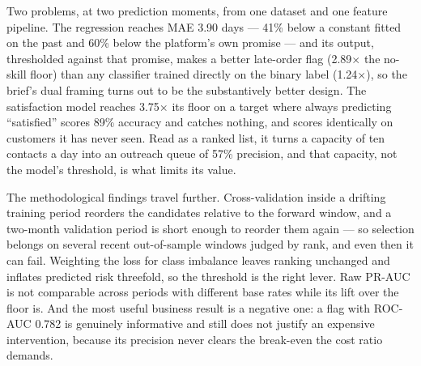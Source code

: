 Two problems, at two prediction moments, from one dataset and one feature
pipeline. The regression reaches MAE 3.90 days --- 41\% below a constant fitted
on the past and 60\% below the platform's own promise --- and its output,
thresholded against that promise, makes a better late-order flag (2.89$\times$
the no-skill floor) than any classifier trained directly on the binary label
(1.24$\times$), so the brief's dual framing turns out to be the substantively
better design. The satisfaction model reaches 3.75$\times$ its floor on a target
where always predicting ``satisfied'' scores 89\% accuracy and catches nothing,
and scores identically on customers it has never seen. Read as a ranked list, it
turns a capacity of ten contacts a day into an outreach queue of 57\%
precision, and that capacity, not the model's threshold, is what limits its
value.

The methodological findings travel further. Cross-validation inside a drifting
training period reorders the candidates relative to the forward window, and a
two-month validation period is short enough to reorder them again --- so
selection belongs on several recent out-of-sample windows judged by rank, and
even then it can fail. Weighting the loss for class imbalance leaves ranking
unchanged and inflates predicted risk threefold, so the threshold is the right
lever. Raw PR-AUC is not comparable across periods with different base rates
while its lift over the floor is. And the most useful business result is a
negative one: a flag with ROC-AUC 0.782 is genuinely informative and still does
not justify an expensive intervention, because its precision never clears the
break-even the cost ratio demands.
